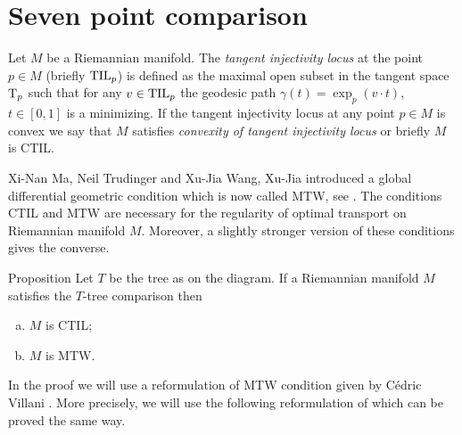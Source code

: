 \section{Seven point comparison}\label{7-dipole}

Let $M$ be a Riemannian manifold.
The \emph{tangent injectivity locus} at the point $p\in M$ (briefly $\mathrm{\rm TIL}_p$) is defined as the maximal open subset in the tangent space $\mathrm{T}_p$ such that for any $v\in\mathrm{\rm TIL}_p$ the geodesic path $\gamma(t)=\exp_p(v\cdot t)$, $t\in [0,1]$ is a minimizing.
If the tangent injectivity locus at any point $p\in M$ is convex we say that $M$ satisfies \emph{convexity of  tangent injectivity locus} or briefly $M$ is CTIL.

Xi-Nan Ma, Neil Trudinger and Xu-Jia Wang, Xu-Jia introduced a global differential geometric condition which is now called MTW, see \cite{MTW}.
The conditions CTIL and MTW are necessary for the regularity of optimal transport on Riemannian manifold $M$.
Moreover, a slightly stronger version of these conditions gives the converse.

{
\begin{comment}
\begin{wrapfigure}[6]{r}{24 mm}
\begin{tikzpicture}[scale=1,
  thick,main node/.style={circle,draw,font=\sffamily\bfseries,minimum size=3mm}]

  \node[main node] (0) at (1/6,1/2) {};
   \node[main node] (1) at (1/6,3/2) {};
  \node[main node] (2) at (1,0){};
  \node[main node] (3) at (1,1){};
  \node[main node] (4) at (1,2) {};
  \node[main node] (5) at (2,0) {};
  \node[main node] (6) at (2,1) {};

  \path[every node/.style={font=\sffamily\small}]
     (0) edge node[above]{}(3)
   (1) edge node[above]{}(3)
   (2) edge node[above]{}(3)
   (3) edge node[above]{}(6)
   (4) edge node[above]{}(3)
   (5) edge node[above]{}(6);
\end{tikzpicture}
\end{wrapfigure}
\end{comment}

\begin{thm}{Proposition}\label{T=>CTIL+MTW}
Let $T$ be the tree as on the diagram.
If a Riemannian manifold $M$ satisfies the $T$-tree comparison then 
\begin{enumerate}[(a)]
\item\label{T=>CTIL:CTIL} $M$ is CTIL;
\item\label{T=>CTIL:MTW} $M$ is MTW.
\end{enumerate}

\end{thm}

In the proof we will use a reformulation of MTW condition
given by Cédric Villani \cite[2.6]{MTW+CTIL}.
More precisely, we will use the following reformulation of which can be proved the same way.

}

